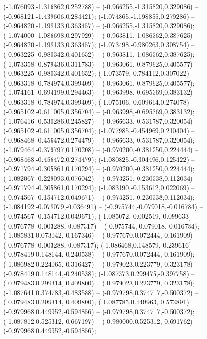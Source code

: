  (-1.076093,-1.316862,0.252788) -- (-0.966255,-1.315820,0.329086) -- (-0.968121,-1.439606,0.284421);
 (-1.074865,-1.198855,0.279286) -- (-0.964820,-1.198133,0.363457) -- (-0.966255,-1.315820,0.329086);
 (-1.074000,-1.086698,0.297929) -- (-0.963811,-1.086362,0.387625) -- (-0.964820,-1.198133,0.363457);
 (-1.073498,-0.980263,0.308754) -- (-0.963225,-0.980342,0.401652) -- (-0.963811,-1.086362,0.387625);
 (-1.073358,-0.879436,0.311783) -- (-0.963061,-0.879925,0.405577) -- (-0.963225,-0.980342,0.401652);
 (-1.073579,-0.784112,0.307022) -- (-0.963318,-0.784974,0.399409) -- (-0.963061,-0.879925,0.405577);
 (-1.074161,-0.694199,0.294463) -- (-0.963998,-0.695369,0.383132) -- (-0.963318,-0.784974,0.399409);
 (-1.075106,-0.609614,0.274078) -- (-0.965102,-0.611005,0.356704) -- (-0.963998,-0.695369,0.383132);
 (-1.076416,-0.530286,0.245827) -- (-0.966633,-0.531787,0.320054) -- (-0.965102,-0.611005,0.356704);
 (-1.077985,-0.454969,0.210404) -- (-0.968468,-0.456472,0.274479) -- (-0.966633,-0.531787,0.320054);
 (-1.079464,-0.379797,0.170208) -- (-0.970200,-0.381250,0.224444) -- (-0.968468,-0.456472,0.274479);
 (-1.080825,-0.304496,0.125422) -- (-0.971794,-0.305861,0.170294) -- (-0.970200,-0.381250,0.224444);
 (-1.082067,-0.229093,0.076042) -- (-0.973251,-0.230338,0.112034) -- (-0.971794,-0.305861,0.170294);
 (-1.083190,-0.153612,0.022069) -- (-0.974567,-0.154712,0.049671) -- (-0.973251,-0.230338,0.112034);
 (-1.084192,-0.078079,-0.036491) -- (-0.975744,-0.079018,-0.016784) -- (-0.974567,-0.154712,0.049671);
 (-1.085072,-0.002519,-0.099633) -- (-0.976778,-0.003288,-0.087317) -- (-0.975744,-0.079018,-0.016784);
 (-1.085831,0.073042,-0.167346) -- (-0.977670,0.072444,-0.161909) -- (-0.976778,-0.003288,-0.087317);
 (-1.086468,0.148579,-0.239616) -- (-0.978419,0.148144,-0.240538) -- (-0.977670,0.072444,-0.161909);
 (-1.086982,0.224065,-0.316427) -- (-0.979023,0.223779,-0.323178) -- (-0.978419,0.148144,-0.240538);
 (-1.087373,0.299475,-0.397758) -- (-0.979483,0.299314,-0.409800) -- (-0.979023,0.223779,-0.323178);
 (-1.087641,0.374783,-0.483588) -- (-0.979798,0.374717,-0.500372) -- (-0.979483,0.299314,-0.409800);
 (-1.087785,0.449963,-0.573891) -- (-0.979968,0.449952,-0.594856) -- (-0.979798,0.374717,-0.500372);
 (-1.087812,0.525312,-0.667197) -- (-0.980000,0.525312,-0.691762) -- (-0.979968,0.449952,-0.594856);
